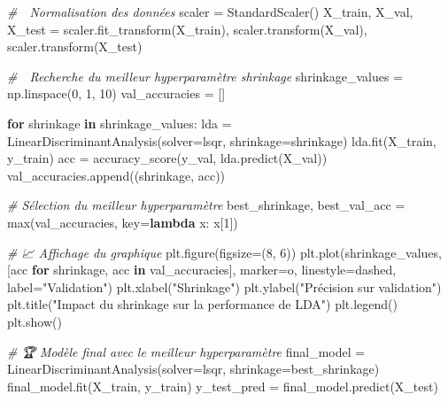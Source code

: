 \documentclass[
]{article}
\newenvironment{Shaded}{}{}
\newcommand{\BuiltInTok}[1]{\textcolor[rgb]{0.00,0.50,0.00}{#1}}
\newcommand{\CommentTok}[1]{\textcolor[rgb]{0.38,0.63,0.69}{\textit{#1}}}
\newcommand{\ControlFlowTok}[1]{\textcolor[rgb]{0.00,0.44,0.13}{\textbf{#1}}}
\newcommand{\DecValTok}[1]{\textcolor[rgb]{0.25,0.63,0.44}{#1}}
\newcommand{\KeywordTok}[1]{\textcolor[rgb]{0.00,0.44,0.13}{\textbf{#1}}}
\newcommand{\NormalTok}[1]{#1}
\newcommand{\OperatorTok}[1]{\textcolor[rgb]{0.40,0.40,0.40}{#1}}
\newcommand{\StringTok}[1]{\textcolor[rgb]{0.25,0.44,0.63}{#1}}
\begin{document}
\begin{Shaded}
\begin{Highlighting}[]
\CommentTok{\# 🔢 Normalisation des données}
\NormalTok{scaler }\OperatorTok{=}\NormalTok{ StandardScaler()}
\NormalTok{X\_train, X\_val, X\_test }\OperatorTok{=}\NormalTok{ scaler.fit\_transform(X\_train), scaler.transform(X\_val), scaler.transform(X\_test)}

\CommentTok{\# 🎯 Recherche du meilleur hyperparamètre shrinkage}
\NormalTok{shrinkage\_values }\OperatorTok{=}\NormalTok{ np.linspace(}\DecValTok{0}\NormalTok{, }\DecValTok{1}\NormalTok{, }\DecValTok{10}\NormalTok{)}
\NormalTok{val\_accuracies }\OperatorTok{=}\NormalTok{ []}

\ControlFlowTok{for}\NormalTok{ shrinkage }\KeywordTok{in}\NormalTok{ shrinkage\_values:}
\NormalTok{    lda }\OperatorTok{=}\NormalTok{ LinearDiscriminantAnalysis(solver}\OperatorTok{=}\StringTok{\textquotesingle{}lsqr\textquotesingle{}}\NormalTok{, shrinkage}\OperatorTok{=}\NormalTok{shrinkage)}
\NormalTok{    lda.fit(X\_train, y\_train)}
\NormalTok{    acc }\OperatorTok{=}\NormalTok{ accuracy\_score(y\_val, lda.predict(X\_val))}
\NormalTok{    val\_accuracies.append((shrinkage, acc))}

\CommentTok{\# Sélection du meilleur hyperparamètre}
\NormalTok{best\_shrinkage, best\_val\_acc }\OperatorTok{=} \BuiltInTok{max}\NormalTok{(val\_accuracies, key}\OperatorTok{=}\KeywordTok{lambda}\NormalTok{ x: x[}\DecValTok{1}\NormalTok{])}

\CommentTok{\# 📈 Affichage du graphique}
\NormalTok{plt.figure(figsize}\OperatorTok{=}\NormalTok{(}\DecValTok{8}\NormalTok{, }\DecValTok{6}\NormalTok{))}
\NormalTok{plt.plot(shrinkage\_values, [acc }\ControlFlowTok{for}\NormalTok{ shrinkage, acc }\KeywordTok{in}\NormalTok{ val\_accuracies], marker}\OperatorTok{=}\StringTok{\textquotesingle{}o\textquotesingle{}}\NormalTok{, linestyle}\OperatorTok{=}\StringTok{\textquotesingle{}dashed\textquotesingle{}}\NormalTok{, label}\OperatorTok{=}\StringTok{"Validation"}\NormalTok{)}
\NormalTok{plt.xlabel(}\StringTok{"Shrinkage"}\NormalTok{)}
\NormalTok{plt.ylabel(}\StringTok{"Précision sur validation"}\NormalTok{)}
\NormalTok{plt.title(}\StringTok{"Impact du shrinkage sur la performance de LDA"}\NormalTok{)}
\NormalTok{plt.legend()}
\NormalTok{plt.show()}

\CommentTok{\# 🏆 Modèle final avec le meilleur hyperparamètre}
\NormalTok{final\_model }\OperatorTok{=}\NormalTok{ LinearDiscriminantAnalysis(solver}\OperatorTok{=}\StringTok{\textquotesingle{}lsqr\textquotesingle{}}\NormalTok{, shrinkage}\OperatorTok{=}\NormalTok{best\_shrinkage)}
\NormalTok{final\_model.fit(X\_train, y\_train)}
\NormalTok{y\_test\_pred }\OperatorTok{=}\NormalTok{ final\_model.predict(X\_test)}


\end{Highlighting}
\end{Shaded}
\end{document}
